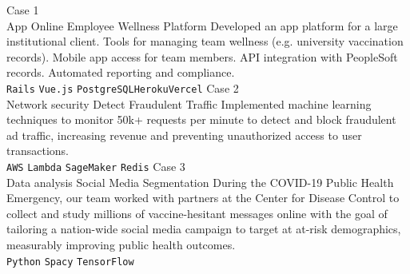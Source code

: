 \documentclass[11pt]{developercv} %
\begin{document}
\begin{entrylist}
	\entry
		{Case 1\\\footnotesize{App}}
		{Online Employee Wellness Platform}
		{ }
		{Developed an app platform for a large institutional client. Tools for managing team wellness (e.g. university vaccination records). Mobile app access for team members. API integration with PeopleSoft records. Automated reporting and compliance. 
        \\ 
        \texttt{Rails}\slashsep
        \texttt{Vue.js}\slashsep
        \texttt{PostgreSQL}\slashsep\texttt{Heroku}\slashsep\texttt{Vercel}}
	\entry
		{Case 2\\\footnotesize{Network security}}
		{Detect Fraudulent Traffic}
		{ }
		{Implemented machine learning techniques to monitor 50k+ requests per minute to detect and block fraudulent ad traffic, increasing revenue and preventing unauthorized access to user transactions.
        \\ 
        \texttt{AWS}\slashsep
        \texttt{Lambda}\slashsep
        \texttt{SageMaker}\slashsep
        \texttt{Redis}}
	   \entry
		{Case 3\\\footnotesize{Data analysis}}
		{Social Media Segmentation}
		{ }
		{During the COVID-19 Public Health Emergency, our team worked with partners at the Center for Disease Control to collect and study millions of vaccine-hesitant messages online with the goal of tailoring a nation-wide social media campaign to target at at-risk demographics, measurably improving public health outcomes. 
        \\ 
        \texttt{Python}\slashsep
        \texttt{Spacy}\slashsep
        \texttt{TensorFlow}}
\end{entrylist}

\end{document}
